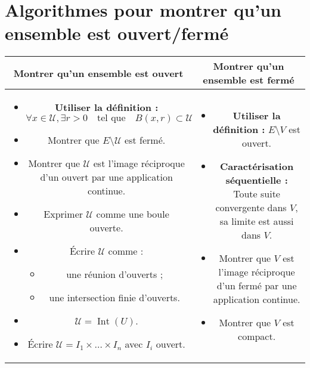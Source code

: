 \documentclass[a4paper]{report}
\theoremstyle{definition}
\begin{document}
\section{Algorithmes pour montrer qu'un ensemble est ouvert/fermé}
\begin{center}
    
\begin{tabular}{c | c}
    {\large \bf
    Montrer qu'un ensemble est ouvert      } 
 & 
    {\large \bf
    Montrer qu'un ensemble est fermé }
 \\
 \hline
 \parbox[t]{8cm}{
\begin{itemize}
    \item \textbf{Utiliser la définition :} 
    \[
    \forall x \in \mathcal{U}, \exists r > 0 \quad \text{tel que} \quad B(x, r) \subset \mathcal{U}
    \]
    
    \item Montrer que \( E \setminus \mathcal{U} \) est fermé.
    
    \item Montrer que \(\mathcal{U}\) est l'image réciproque d'un ouvert par une application continue.
    
    \item Exprimer \(\mathcal{U}\) comme une boule ouverte.
    
    \item Écrire \(\mathcal{U}\) comme :
    \begin{itemize}
        \item une réunion d'ouverts ;
        \item une intersection finie d'ouverts.
    \end{itemize}
    
    \item \(\mathcal{U} = \operatorname{Int}(U)\).
    
    \item Écrire \(\mathcal{U} = I_1 \times \dots \times I_n\) avec \( I_i \) ouvert.
\end{itemize}
} & \parbox[t]{8cm}{
\begin{itemize}
    \item \textbf{Utiliser la définition :} \( E \setminus V \) est ouvert.
    
    \item \textbf{Caractérisation séquentielle :} Toute suite convergente dans \(V\), sa limite est aussi dans \(V\).
    
    \item Montrer que \(V\) est l'image réciproque d'un fermé par une application continue.
    
    \item Montrer que \(V\) est compact.
\end{itemize}
}
\end{tabular}
\end{center}
\end{document}
